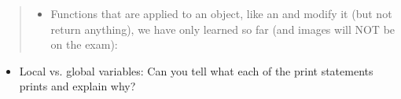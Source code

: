 \documentclass[letterpaper,10pt,english]{sphinxmanual}
\begin{document}
\begin{quote}
\begin{itemize}
\end{itemize}
\begin{quote}

\begin{sphinxVerbatim}[commandchars=\\\{\}]
  
 
\end{sphinxVerbatim}
\end{quote}
\begin{itemize}
\item {} 
Functions that are applied to an object, like an  and
modify it (but not return anything), we have only learned 
so far (and images will NOT be on the exam):

\end{itemize}
\begin{quote}

\begin{sphinxVerbatim}[commandchars=\\\{\}]
  
\end{sphinxVerbatim}
\end{quote}
\end{quote}
\begin{itemize}
\item {} 
Local vs. global variables: Can you tell what each of the print statements
prints and explain why?

\end{itemize}
\end{document}
